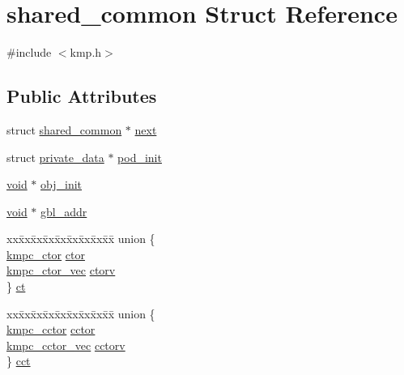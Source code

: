 \hypertarget{structshared__common}{\section{shared\-\_\-common Struct Reference}
\label{structshared__common}
}


{\ttfamily \#include $<$kmp.\-h$>$}

\subsection*{Public Attributes}
\begin{DoxyCompactItemize}
\item 
struct \hyperlink{structshared__common}{shared\-\_\-common} $\ast$ \hyperlink{structshared__common_aa54da923f39ba340f472b4a62205b967}{next}
\item 
struct \hyperlink{structprivate__data}{private\-\_\-data} $\ast$ \hyperlink{structshared__common_a7609ddff99a7ccff444c4e1f2a7216e1}{pod\-\_\-init}
\item 
\hyperlink{ittnotify__static_8h_af941d56e55e3c5465135b60c4d6343ed}{void} $\ast$ \hyperlink{structshared__common_a5afc5429e242b0940b1624352aa7df79}{obj\-\_\-init}
\item 
\hyperlink{ittnotify__static_8h_af941d56e55e3c5465135b60c4d6343ed}{void} $\ast$ \hyperlink{structshared__common_abfaf275dda5ac5223f6e0f0aa333b52b}{gbl\-\_\-addr}
\item 
\begin{tabbing}
xx\=xx\=xx\=xx\=xx\=xx\=xx\=xx\=xx\=\kill
union \{\\
\>\hyperlink{group__THREADPRIVATE_ga0c2f8074a8474eee42bc96a4bdc7679a}{kmpc\_ctor} \hyperlink{structshared__common_a26bff742774584fe18d5bca4b432b1ed}{ctor}\\
\>\hyperlink{group__THREADPRIVATE_gac1f868aef7d531d34b91eaa57e339f21}{kmpc\_ctor\_vec} \hyperlink{structshared__common_aa82b661dba8988acd64a0d185851efce}{ctorv}\\
\} \hyperlink{structshared__common_ac98f8d219b58bb8cb289d896c2328e21}{ct}\\

\end{tabbing}\item 
\begin{tabbing}
xx\=xx\=xx\=xx\=xx\=xx\=xx\=xx\=xx\=\kill
union \{\\
\>\hyperlink{group__THREADPRIVATE_gab6148c019e88c8853596bf5f516373b4}{kmpc\_cctor} \hyperlink{structshared__common_a66f5f4ebb70f7db1a21310d31a387377}{cctor}\\
\>\hyperlink{group__THREADPRIVATE_gaf9503cacabf6cf90ed34f2727fc480bc}{kmpc\_cctor\_vec} \hyperlink{structshared__common_a149cfcc7e7cadd6231c21339d9adabea}{cctorv}\\
\} \hyperlink{structshared__common_a3292a73e5a3070dfdb448f7b205f68a5}{cct}\\


\end{tabbing}
\end{DoxyCompactItemize}

